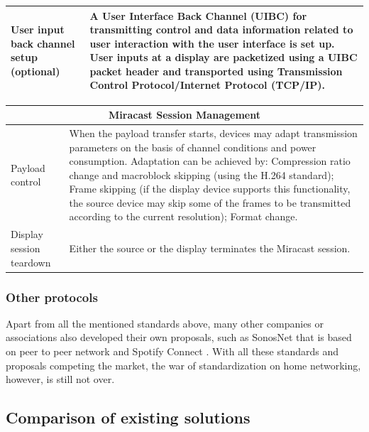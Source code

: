 \begin{center}
\begin{tabular}{ | p{3.5cm} | p{10cm} |}
    User input back channel setup (optional) & A User Interface Back Channel 
    (UIBC) for transmitting control and data information related to user 
    interaction with the user interface is set up. User inputs at a display are 
    packetized using a UIBC packet header and transported using Transmission 
    Control Protocol/Internet Protocol (TCP/IP).\\ \hline 
    \end{tabular} 
\end{center} 

\begin{center} 
    \begin{tabular}{ | p{3.5cm} | p{10cm} |} 
     \hline 
    \multicolumn{2}{c}{Miracast Session Management}\\ 
    \hline 
    Payload control & When the payload transfer starts, devices may adapt 
    transmission parameters on the basis of channel conditions and power 
    consumption. Adaptation can be achieved by: Compression ratio change and 
    macroblock skipping (using the H.264 standard); Frame skipping (if the 
    display device supports this functionality, the source device may skip some 
    of the frames to be transmitted according to the current resolution); 
    Format change. \\ \hline 
    
    Display session teardown  & Either the source or the display terminates the 
    Miracast session. \\ \hline 
    \end{tabular} 
\end{center} 

\subsubsection{Other protocols} 
Apart from all the mentioned standards above, many other companies or associations 
also developed their own proposals, such as SonosNet \cite{sonosnet} that is 
based on peer to peer network and Spotify Connect \cite{spotifyconnect}. With all these standards and proposals competing the market, the war of standardization on home networking, however, is still not over. 

\subsection{Comparison of existing solutions} 
